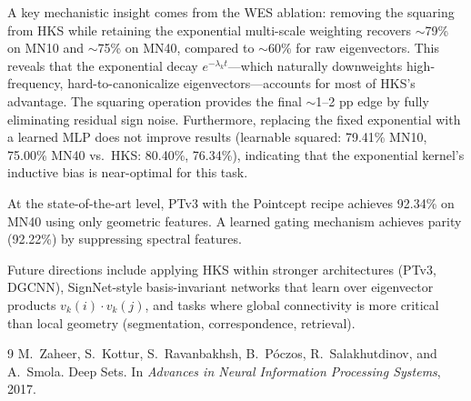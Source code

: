 \documentclass[11pt]{article}
\begin{document}
A key mechanistic insight comes from the WES ablation: removing the squaring from HKS
while retaining the exponential multi-scale weighting recovers $\sim$79\% on MN10 and
$\sim$75\% on MN40, compared to $\sim$60\% for raw eigenvectors. This reveals that the
exponential decay $e^{-\lambda_k t}$---which naturally downweights high-frequency,
hard-to-canonicalize eigenvectors---accounts for most of HKS's advantage. The squaring
operation provides the final $\sim$1--2 pp edge by fully eliminating residual sign noise.
Furthermore, replacing the fixed exponential with a learned MLP does not improve results
(learnable squared: 79.41\% MN10, 75.00\% MN40 vs.\ HKS: 80.40\%, 76.34\%), indicating
that the exponential kernel's inductive bias is near-optimal for this task.

At the state-of-the-art level, PTv3 with the Pointcept recipe achieves 92.34\% on MN40
using only geometric features. A learned gating mechanism achieves parity (92.22\%) by
suppressing spectral features.

Future directions include applying HKS within stronger architectures (PTv3, DGCNN),
SignNet-style basis-invariant networks that learn over eigenvector products
$v_k(i) \cdot v_k(j)$, and tasks where global connectivity is more critical than local
geometry (segmentation, correspondence, retrieval).

\begin{thebibliography}{9}
M.~Zaheer, S.~Kottur, S.~Ravanbakhsh, B.~P{\'o}czos, R.~Salakhutdinov, and
A.~Smola. Deep Sets. In \emph{Advances in Neural Information Processing Systems}, 2017.
\end{thebibliography}
\end{document}
